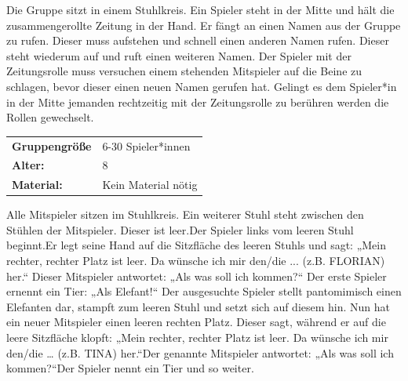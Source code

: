  Die Gruppe sitzt in einem Stuhlkreis. Ein Spieler steht in der Mitte und hält die zusammengerollte Zeitung in der Hand. Er fängt an einen Namen aus der Gruppe zu rufen. Dieser muss aufstehen und schnell einen anderen Namen rufen.  Dieser steht wiederum auf und ruft einen weiteren Namen. Der Spieler mit der Zeitungsrolle muss versuchen einem stehenden Mitspieler auf die Beine zu schlagen, bevor dieser einen neuen Namen gerufen hat. Gelingt es dem Spieler*in in der Mitte jemanden rechtzeitig mit der Zeitungsrolle zu berühren werden die Rollen gewechselt.  \\



\begin{table}[H]
\begin{tabular}{>{\bfseries}lp{8cm}}
  Gruppengröße   & 6-30 Spieler*innen\\
    Alter: & 8 \\
    Material: & Kein Material nötig \\
\end{tabular}
\end{table} 
 Alle Mitspieler sitzen im Stuhlkreis. Ein weiterer Stuhl steht zwischen den Stühlen der Mitspieler. Dieser ist leer.Der Spieler links vom leeren Stuhl beginnt.Er legt seine Hand auf die Sitzfläche des leeren Stuhls und sagt: „Mein rechter, rechter Platz ist leer. Da wünsche ich mir den/die ... (z.B. FLORIAN) her.“ Dieser Mitspieler antwortet: „Als was soll ich kommen?“ Der erste Spieler ernennt ein Tier: „Als Elefant!“ Der ausgesuchte Spieler stellt pantomimisch einen Elefanten dar, stampft zum leeren Stuhl und setzt sich auf diesem hin. Nun hat ein neuer Mitspieler einen leeren rechten Platz. Dieser sagt, während er auf die leere Sitzfläche klopft: „Mein rechter, rechter Platz ist leer. Da wünsche ich mir den/die … (z.B. TINA) her.“Der genannte Mitspieler antwortet: „Als was soll ich kommen?“Der Spieler nennt ein Tier und so weiter. \\

\newpage

